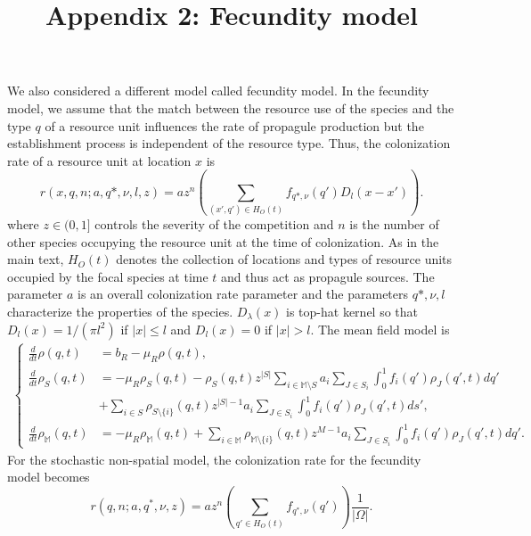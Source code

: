 \documentclass[8pt,a4paper]{article}
\title{Appendix 2: Fecundity model}
\author{}
\date{}
\begin{document}
\maketitle
\vspace{-1cm}
We also considered a different model called fecundity model.
 In the fecundity model, we assume that the match between the resource use of the species and the type $q$ of a resource unit influences the rate of propagule production but the establishment process is independent of the resource type. 
 Thus, the colonization rate of a resource unit at location $x$ is 
  \begin{equation*}
	r(x,q,n; a, q*,\nu, l, z) = a z^n \left( \sum_{(x' ,q') \in H_O(t)} f_{q*, \nu} (q') D_l(x - x') \right).
\end{equation*}
 where $z \in (0,1]$ controls the severity of the competition and $n$ is the number of other species occupying the resource unit at the time of colonization.
As in the main text, $H_O(t)$ denotes the collection of locations and types of resource units occupied by the focal species  at time $t$ and thus act as propagule sources.
The parameter $a$ is an overall colonization rate parameter and the parameters $q*,\nu , l$ characterize the properties of the species.
$D_{\lambda} (x)$ is top-hat kernel so that $D_l(x) = 1/(\pi l^2)$ if $|x| \leq l$ and $D_l(x) = 0$ if $|x| >  l$. 
The mean field model is
\begin{eqnarray*}
\begin{cases}
\displaystyle{\frac{d}{dt}}\rho(q,t)& = b_R-\mu_R \rho(q,t),\\
\displaystyle{\frac{d}{dt}}\rho_{S}(q,t)& = -\mu_R \rho_S(q,t) -\rho_S(q,t)z^{|S|} \sum_{i \in \mathbb{M} \setminus S} a_i \sum_{J \in S_i} \int_0^1 f_i(q') \rho_J(q',t) dq' \\
 & + \sum_{i \in S} \rho_{S \setminus{\{i\}}}(q,t) z^{|S|-1} a_i \sum_{J \in S_i} \int_0^1 f_i(q') \rho_J(q',t) ds',  \\
\displaystyle{\frac{d}{dt}} \rho_{\mathbb{M}}(q,t) & = - \mu_R \rho_{\mathbb{M}}(q,t) + \sum_{i \in \mathbb{M}} \rho_{\mathbb{M} \setminus{\{i\}}}(q,t) z^{M-1} a_i \sum_{J \in S_i} \int_0^1 f_i(q') \rho_J(q',t) dq'.
\end{cases}
\end{eqnarray*}
%
For the stochastic non-spatial model, the colonization rate for the fecundity model becomes 
\begin{equation*}
r(q, n ; a, q^*, \nu, z) = a z^n \left( \sum_{q' \in H_O(t)} f_{q^*,\nu} (q') \right)\frac{1}{|\Omega|}.
\end{equation*}
\end{document}
